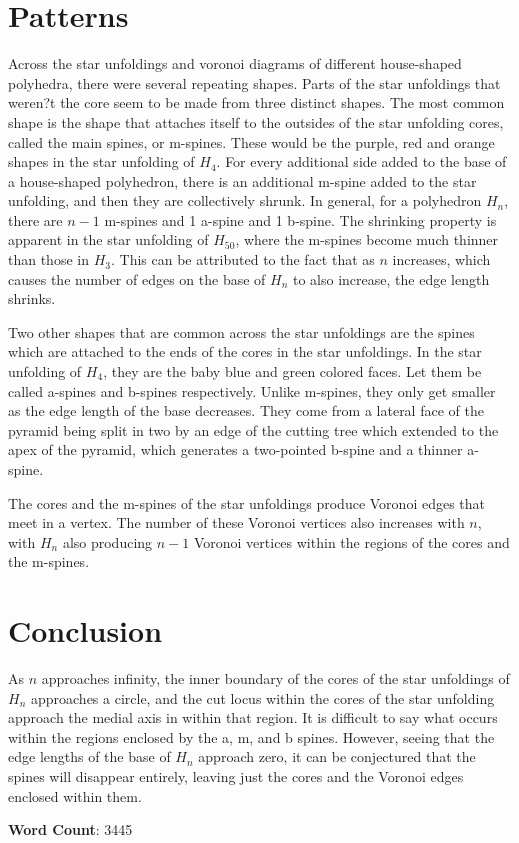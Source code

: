 \documentclass[12 pt]{article}
\begin{document}
\section{Patterns}
Across the star unfoldings and voronoi diagrams of different house-shaped polyhedra, there were several repeating shapes. Parts of the star unfoldings that weren?t the core seem to be made from three distinct shapes. The most common shape is the shape that attaches itself to the outsides of the star unfolding cores, called the main spines, or m-spines. These would be the purple, red and orange shapes in the star unfolding of $H_4$. For every additional side added to the base of a house-shaped polyhedron, there is an additional m-spine added to the star unfolding, and then they are collectively shrunk. In general, for a polyhedron $H_n$, there are $n-1$ m-spines and 1 a-spine and 1 b-spine. The shrinking property is apparent in the star unfolding of $H_{50}$, where the m-spines become much thinner than those in $H_3$. This can be attributed to the fact that as $n$ increases, which causes the number of edges on the base of $H_n$ to also increase, the edge length shrinks. 

Two other shapes that are common across the star unfoldings are the spines which are attached to the ends of the cores in the star unfoldings. In the star unfolding of $H_{4}$, they are the baby blue and green colored faces. Let them be called a-spines and b-spines respectively. Unlike m-spines, they only get smaller as the edge length of the base decreases. They come from a lateral face of the pyramid being split in two by an edge of the cutting tree which extended to the apex of the pyramid, which generates a two-pointed b-spine and a thinner a-spine.

The cores and the m-spines of the star unfoldings produce Voronoi edges that meet in a vertex. The number of these Voronoi vertices also increases with $n$, with $H_n$ also producing $n-1$ Voronoi vertices within the regions of the cores and the m-spines. 

\section{Conclusion}
As $n$ approaches infinity, the inner boundary of the cores of the star unfoldings of $H_n$ approaches a circle, and the cut locus within the cores of the star unfolding approach the medial axis in within that region.
It is difficult to say what occurs within the regions enclosed by the a, m, and b spines. However, seeing that the edge lengths of the base of $H_n$ approach zero, it can be conjectured that the spines will disappear entirely, leaving just the cores and the Voronoi edges enclosed within them.

\textbf{Word Count}: 3445

\newpage



\end{document}
